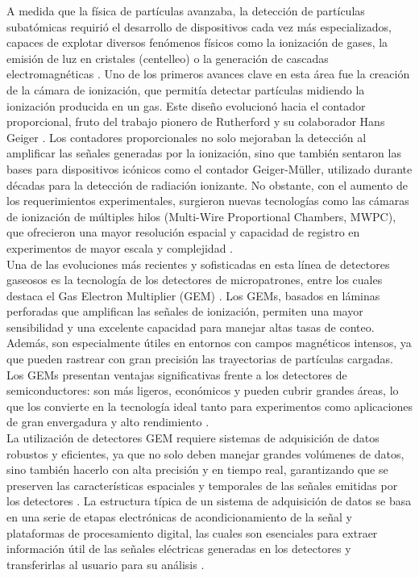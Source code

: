 \documentclass{article}
\begin{document}
\noindent A medida que la física de partículas avanzaba, la detección de partículas subatómicas requirió el desarrollo de dispositivos cada vez más especializados, capaces de explotar diversos fenómenos físicos como la ionización de gases, la emisión de luz en cristales (centelleo) o la generación de cascadas electromagnéticas \cite{kolanoski2020particle}. Uno de los primeros avances clave en esta área fue la creación de la cámara de ionización, que permitía detectar partículas midiendo la ionización producida en un gas. Este diseño evolucionó hacia el contador proporcional, fruto del trabajo pionero de Rutherford y su colaborador Hans Geiger \cite{friedman1949geiger}. Los contadores proporcionales no solo mejoraban la detección al amplificar las señales generadas por la ionización, sino que también sentaron las bases para dispositivos icónicos como el contador Geiger-Müller, utilizado durante décadas para la detección de radiación ionizante. No obstante, con el aumento de los requerimientos experimentales, surgieron nuevas tecnologías como las cámaras de ionización de múltiples hilos (Multi-Wire Proportional Chambers, MWPC), que ofrecieron una mayor resolución espacial y capacidad de registro en experimentos de mayor escala y complejidad \cite{charpak1979multiwire}.\\

\noindent Una de las evoluciones más recientes y sofisticadas en esta línea de detectores gaseosos es la tecnología de los detectores de micropatrones, entre los cuales destaca el Gas Electron Multiplier (GEM) \cite{sauli1997gem}. Los GEMs, basados en láminas perforadas que amplifican las señales de ionización, permiten una mayor sensibilidad y una excelente capacidad para manejar altas tasas de conteo. Además, son especialmente útiles en entornos con campos magnéticos intensos, ya que pueden rastrear con gran precisión las trayectorias de partículas cargadas. Los GEMs presentan ventajas significativas frente a los detectores de semiconductores: son más ligeros, económicos y pueden cubrir grandes áreas, lo que los convierte en la tecnología ideal tanto para experimentos como aplicaciones de gran envergadura y alto rendimiento \cite{sauli1999micropattern}.\\

\noindent La utilización de detectores GEM requiere sistemas de adquisición de datos robustos y eficientes, ya que no solo deben manejar grandes volúmenes de datos, sino también hacerlo con alta precisión y en tiempo real, garantizando que se preserven las características espaciales y temporales de las señales emitidas por los detectores \cite{cheng2012multi}. La estructura típica de un sistema de adquisición de datos se basa en una serie de etapas electrónicas de acondicionamiento de la señal y plataformas de procesamiento digital, las cuales son esenciales para extraer información útil de las señales eléctricas generadas en los detectores y transferirlas al usuario para su análisis \cite{kolanoski2020particle2}.\\
\end{document}
